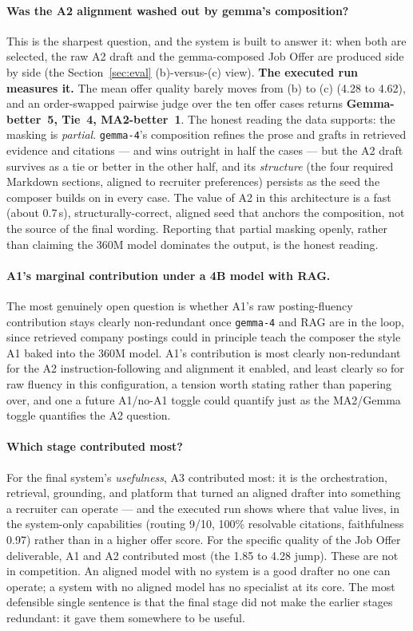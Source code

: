 \paragraph{Was the A2 alignment washed out by gemma's composition?}
This is the sharpest question, and the system is built to answer it: when both are selected,
the raw A2 draft and the gemma-composed Job Offer are produced side by side (the
Section~\ref{sec:eval} (b)-versus-(c) view). \textbf{The executed run measures it.} The mean
offer quality barely moves from (b) to (c) (4.28 to 4.62), and an order-swapped pairwise
judge over the ten offer cases returns \textbf{Gemma-better~5, Tie~4, MA2-better~1}. The
honest reading the data supports: the masking is \emph{partial}. \verb|gemma-4|'s composition
refines the prose and grafts in retrieved evidence and citations --- and wins outright in
half the cases --- but the A2 draft survives as a tie or better in the other half, and its
\emph{structure} (the four required Markdown sections, aligned to recruiter preferences)
persists as the seed the composer builds on in every case. The value of A2 in this
architecture is a fast (about 0.7\,s), structurally-correct, aligned seed that anchors the
composition, not the source of the final wording. Reporting that partial masking openly,
rather than claiming the 360M model dominates the output, is the honest reading.

\paragraph{A1's marginal contribution under a 4B model with RAG.}
The most genuinely open question is whether A1's raw posting-fluency contribution stays
clearly non-redundant once \verb|gemma-4| and RAG are in the loop, since retrieved company
postings could in principle teach the composer the style A1 baked into the 360M model. A1's
contribution is most clearly non-redundant for the A2 instruction-following and alignment it
enabled, and least clearly so for raw fluency in this configuration, a tension worth stating
rather than papering over, and one a future A1/no-A1 toggle could quantify just as the
MA2/Gemma toggle quantifies the A2 question.

\paragraph{Which stage contributed most?}
For the final system's \emph{usefulness}, A3 contributed most: it is the orchestration,
retrieval, grounding, and platform that turned an aligned drafter into something a recruiter
can operate --- and the executed run shows where that value lives, in the system-only
capabilities (routing 9/10, 100\% resolvable citations, faithfulness 0.97) rather than in a
higher offer score. For the specific quality of the Job Offer deliverable, A1 and A2
contributed most (the 1.85 to 4.28 jump). These are not in competition. An aligned model with
no system is a good drafter no one can operate; a system with no aligned model has no
specialist at its core. The most defensible single sentence is that the final stage did not
make the earlier stages redundant: it gave them somewhere to be useful.
